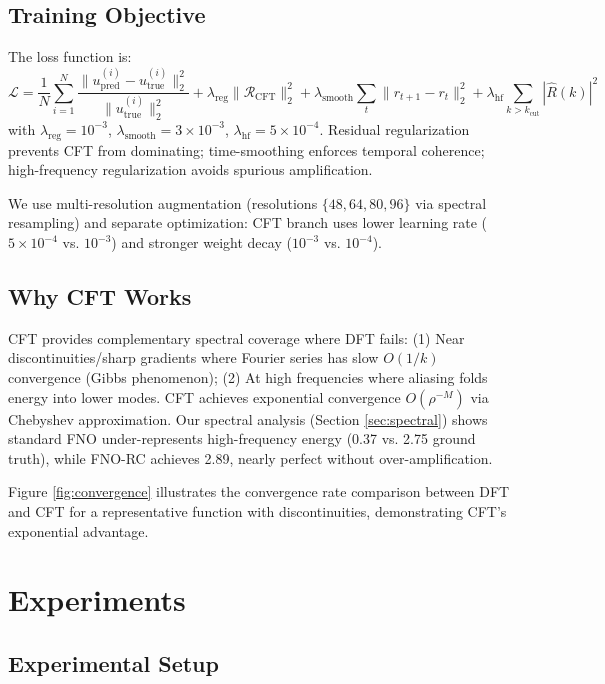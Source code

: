\documentclass[11pt]{article}
\begin{document}
\subsection{Training Objective}

The loss function is:
\begin{equation}
\mathcal{L} = \frac{1}{N} \sum_{i=1}^{N} \frac{\|u_{\text{pred}}^{(i)} - u_{\text{true}}^{(i)}\|_2^2}{\|u_{\text{true}}^{(i)}\|_2^2} + \lambda_{\text{reg}} \|\mathcal{R}_{\text{CFT}}\|_2^2 + \lambda_{\text{smooth}} \sum_{t} \|r_{t+1} - r_t\|_2^2 + \lambda_{\text{hf}} \sum_{k > k_{\text{cut}}} |\hat{R}(k)|^2
\end{equation}
with $\lambda_{\text{reg}} = 10^{-3}$, $\lambda_{\text{smooth}} = 3 \times 10^{-3}$, $\lambda_{\text{hf}} = 5 \times 10^{-4}$. Residual regularization prevents CFT from dominating; time-smoothing enforces temporal coherence; high-frequency regularization avoids spurious amplification.

We use multi-resolution augmentation (resolutions $\{48, 64, 80, 96\}$ via spectral resampling) and separate optimization: CFT branch uses lower learning rate ($5 \times 10^{-4}$ vs. $10^{-3}$) and stronger weight decay ($10^{-3}$ vs. $10^{-4}$).

\subsection{Why CFT Works}

CFT provides complementary spectral coverage where DFT fails: (1) Near discontinuities/sharp gradients where Fourier series has slow $O(1/k)$ convergence (Gibbs phenomenon); (2) At high frequencies where aliasing folds energy into lower modes. CFT achieves exponential convergence $O(\rho^{-M})$ via Chebyshev approximation. Our spectral analysis (Section \ref{sec:spectral}) shows standard FNO under-represents high-frequency energy (0.37 vs. 2.75 ground truth), while FNO-RC achieves 2.89, nearly perfect without over-amplification.

Figure \ref{fig:convergence} illustrates the convergence rate comparison between DFT and CFT for a representative function with discontinuities, demonstrating CFT's exponential advantage.

\section{Experiments}

\subsection{Experimental Setup}
\end{document}
